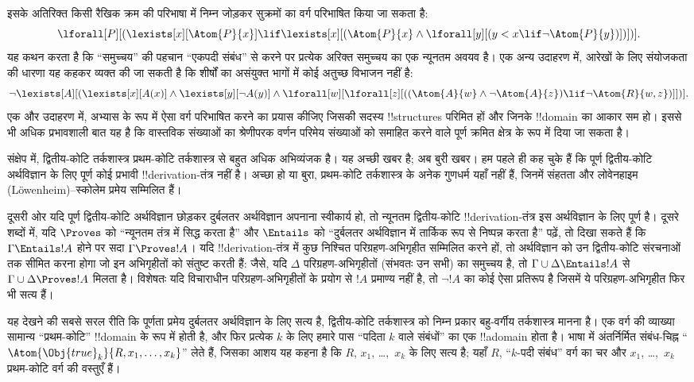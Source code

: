 \documentclass[../../../include/open-logic-section]{subfiles}
\begin{document}
इसके अतिरिक्त किसी रैखिक क्रम की परिभाषा में निम्न जोड़कर सुक्रमों का वर्ग
परिभाषित किया जा सकता है:
\[
\lforall[P][(\lexists[x][\Atom{P}{x}] \lif \lexists[x][(\Atom{P}{x}
    \land \lforall[y][(y < x \lif \lnot \Atom{P}{y})])])].
\]
यह कथन करता है कि ``समुच्चय'' की पहचान ``एकपदी संबंध'' से करने पर प्रत्येक
अरिक्त समुच्चय का एक न्यूनतम अवयव है। एक अन्य उदाहरण में, आरेखों के लिए
संयोजकता की धारणा यह कहकर व्यक्त की जा सकती है कि शीर्षों का असंयुक्त भागों
में कोई अतुच्छ विभाजन नहीं है:
\[
\lnot \lexists[A][(\lexists[x][A(x)] \land \lexists[y][\lnot A(y)]
  \land \lforall[w][\lforall[z][((\Atom{A}{w} \land \lnot \Atom{A}{z})
      \lif \lnot \Atom{R}{w,z})]])].
\]
एक और उदाहरण में, अभ्यास के रूप में ऐसा वर्ग परिभाषित करने का प्रयास कीजिए
जिसकी सदस्य !!{structure}s परिमित हों और जिनके !!{domain} का आकार सम हो। इससे भी अधिक
प्रभावशाली बात यह है कि वास्तविक संख्याओं का श्रेणीपरक वर्णन परिमेय संख्याओं
को समाहित करने वाले पूर्ण क्रमित क्षेत्र के रूप में दिया जा सकता है।

संक्षेप में, द्वितीय-कोटि तर्कशास्त्र प्रथम-कोटि तर्कशास्त्र से बहुत अधिक
अभिव्यंजक है। यह अच्छी खबर है; अब बुरी खबर। हम पहले ही कह चुके हैं कि पूर्ण
द्वितीय-कोटि अर्थविज्ञान के लिए पूर्ण कोई प्रभावी !!{derivation}-तंत्र नहीं
है। अच्छा हो या बुरा, प्रथम-कोटि तर्कशास्त्र के अनेक गुणधर्म यहाँ नहीं हैं,
जिनमें संहतता और लोवेनहाइम (L\"owenheim)--स्कोलेम प्रमेय सम्मिलित हैं।

दूसरी ओर यदि पूर्ण द्वितीय-कोटि अर्थविज्ञान छोड़कर दुर्बलतर अर्थविज्ञान
अपनाना स्वीकार्य हो, तो न्यूनतम द्वितीय-कोटि !!{derivation}-तंत्र इस
अर्थविज्ञान के लिए पूर्ण है। दूसरे शब्दों में, यदि $\Proves$ को ``न्यूनतम
तंत्र में सिद्ध करता है'' और $\Entails$ को ``दुर्बलतर अर्थविज्ञान में
तार्किक रूप से निष्पन्न करता है'' पढ़ें, तो दिखा सकते हैं कि $\Gamma \Entails !A$
होने पर सदा $\Gamma \Proves !A$। यदि !!{derivation}-तंत्र में
कुछ निश्चित परिग्रहण-अभिगृहीत सम्मिलित करने हों, तो अर्थविज्ञान को उन
द्वितीय-कोटि संरचनाओं तक सीमित करना होगा जो इन अभिगृहीतों को संतुष्ट करती
हैं: जैसे, यदि $\Delta$ परिग्रहण-अभिगृहीतों (संभवतः उन सभी) का समुच्चय है,
तो $\Gamma
\cup \Delta \Entails !A$ से $\Gamma \cup \Delta \Proves !A$
मिलता है। विशेषतः यदि विचाराधीन परिग्रहण-अभिगृहीतों के प्रयोग से $!A$
प्रमाण्य नहीं है, तो $\lnot !A$ का कोई ऐसा प्रतिरूप है जिसमें ये
परिग्रहण-अभिगृहीत फिर भी सत्य हैं।

यह देखने की सबसे सरल रीति कि पूर्णता प्रमेय दुर्बलतर अर्थविज्ञान के लिए
सत्य है, द्वितीय-कोटि तर्कशास्त्र को निम्न प्रकार बहु-वर्गीय तर्कशास्त्र
मानना है। एक वर्ग की व्याख्या सामान्य ``प्रथम-कोटि'' !!{domain} के रूप में
होती है, और फिर प्रत्येक $k$ के लिए हमारे पास ``पदिता $k$ वाले संबंधों'' का
एक !!a{domain} होता है। भाषा में अंतर्निर्मित संबंध-चिह्न
``$\Atom{\Obj{true}_k}{R,x_1,\dots,x_k}$'' लेते हैं, जिसका आशय यह कहना है कि
$R$, $x_1$, \dots,~$x_k$ के लिए सत्य है; यहाँ $R$, ``$k$-पदी संबंध'' वर्ग
का चर और $x_1$, \dots,~$x_k$ प्रथम-कोटि वर्ग की वस्तुएँ हैं।
\end{document}

